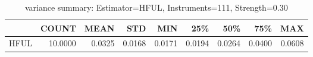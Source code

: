 \begin{table}[ht]
\centering
\caption{variance summary: Estimator=HFUL, Instruments=111, Strength=0.30}
\begin{tabular}{lrrrrrrrr}
\toprule
 & COUNT & MEAN & STD & MIN & 25\% & 50\% & 75\% & MAX \\
\midrule
HFUL & 10.0000 & 0.0325 & 0.0168 & 0.0171 & 0.0194 & 0.0264 & 0.0400 & 0.0608 \\
\bottomrule
\end{tabular}
\end{table}
